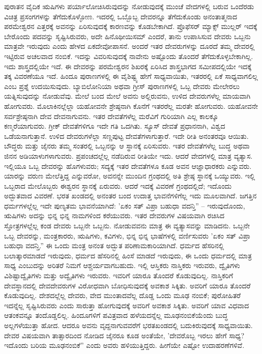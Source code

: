 ಪುರಾತನ ವೈದಿಕ ಋಷಿಗಳು ಪರ್ಯಾಲೋಚಿಸಿರುವುದನ್ನು ನೋಡುವುದಕ್ಕೆ ಮುಂಚೆ ವೇದಗಳಲ್ಲಿ ಬರುವ ಒಂದೆರಡು ವಿಚಿತ್ರ ಪ್ರಸಂಗಗಳನ್ನು ತೆಗೆದುಕೊಳ್ಳೋಣ. ಇದರಲ್ಲಿ ಒಬ್ಬೊಬ್ಬ ದೇವರನ್ನೂ ತೆಗೆದುಕೊಂಡು ಅನಂತಾತ್ಮನಾದ ಪರಮೇಶ್ವರನ ಎತ್ತರಕ್ಕೆ ಅವನನ್ನು ಏರಿಸುವುದಕ್ಕೆ ಕಾರಣವನ್ನು ಕೊಡಬೇಕಾಗಿದೆ. ಪ್ರೊಫೆಸರ್‌ ಮ್ಯಾಕ್ಸ್ ಮುಲ್ಲರ್ ಇದಕ್ಕೆ ಬೇರೊಂದು ಪದವನ್ನು ಸೃಷ್ಟಿಸಿರುವರು, ಅದೇ ಹಿನೊಥೀಯಿಸಮ್  ಎಂದರೆ, ತಾನು ಉಪಾಸಿಸುವ ದೇವರು ಒಬ್ಬನು ಮಾತ್ರವೇ ಇರುವುದು ಎಂದು ಹೇಳದ ಏಕದೇವೋಪಾಸನೆ. ಅಂದರೆ ಇತರ ದೇವರುಗಳನ್ನು ದೂರದೆ ತಮ್ಮ ದೇವರಲ್ಲಿ ಇಟ್ಟಿರುವ ಅಚಲವಾದ ನಂಬಿಕೆ. ಇದನ್ನು ವಿವರಿಸುವುದಕ್ಕೆ ನಾವೇನು ಅಷ್ಟೊಂದು ತೊಂದರೆ ತೆಗೆದುಕೊಳ್ಳಬೇಕಾಗಿಲ್ಲ. ಇದು ಶಾಸ್ತ್ರದಲ್ಲಿಯೇ ಇದೆ. ಈ ದೇವರನ್ನು ಪರಮೇಶ್ವರನ ಶಿಖರಕ್ಕೆ ಏರಿಸಿದ ಶಾಸ್ತ್ರಭಾಗದ ಸಮೀಪದಲ್ಲಿಯೇ ಇದಕ್ಕೆ ತಕ್ಕ ವಿವರಣೆಯೂ ಇದೆ. ಹಿಂದೂ ಪುರಾಣಗಳಲ್ಲಿ ಈ ವೈಶಿಷ್ಟ್ಯ ಹೇಗೆ ಸಾಧ್ಯವಾಯಿತು, ಇತರರಲ್ಲಿ ಏಕೆ ಸಾಧ್ಯವಾಗಲಿಲ್ಲ ಎಂಬ ಪ್ರಶ್ನೆ ಉದಯಿಸುವುದು. ಬ್ಯಾಬಿಲೋನಿಯಾ ಅಥವಾ ಗ್ರೀಸ್ ಪುರಾಣಗಳಲ್ಲಿ ಒಬ್ಬ ದೇವರು ಮೇಲೇರಲು ಯತ್ನಿಸುವುದನ್ನು ನೋಡುವೆವು. ಮೇಲೆ ಬಂದ ಮೇಲೆ ಅವನು ಅಲ್ಲಿರುವನು, ಉಳಿದ ದೇವರುಗಳೆಲ್ಲ ಮಾಯವಾಗಿ ಹೋಗುವರು. ಮೊಲಾಕಿನಲ್ಲೆಲ್ಲಾ ಯಹೋವನೇ ಶ್ರೇಷ್ಠನಾಗಿ ಕೊನೆಗೆ ಇತರರೆಲ್ಲ ಮರತೇ ಹೋಗುವರು. ಯಹೋವನೇ ಸರ್ವಶ್ರೇಷ್ಠನಾಗಿ ದೇವ ದೇವನಾಗುವನು. ಇತರ ದೇವತೆಗಳೆಲ್ಲ ಮರೆವಿಗೆ ಗುರಿಯಾಗಿ ಎಲ್ಲ ಕಾಲಕ್ಕೂ ಕಣ್ಮರೆಯಾಗುವರು. ಗ್ರೀಕ್ ದೇವತೆಗಳಿಗೂ ಇದೇ ಗತಿ ಒದಗಿತು. ಸ್ಯೂಸ್ ದೇವತೆ ಪ್ರಧಾನನಾಗಿ, ವಿಶ್ವದ ಒಡೆಯನಾಗುತ್ತಾನೆ. ಉಳಿದ ದೇವರುಗಳೆಲ್ಲಾ ಸಣ್ಣಪುಟ್ಟ ದೇವತೆಗಳಾಗುತ್ತಾರೆ. ಇದೇ ರೀತಿ ಅನಂತರವೂ ಆಯಿತು. ಬೌದ್ಧರು ಮತ್ತು ಜೈನರು ತಮ್ಮ ಸಂತರಲ್ಲಿ ಒಬ್ಬನನ್ನು ಆ ಸ್ಥಾನಕ್ಕೆ ಏರಿಸುವರು. ಇತರ ದೇವತೆಗಳೆಲ್ಲ ಬುದ್ಧ ಅಥವಾ ಜಿನನ ಅಡಿಯಾಳುಗಳಾಗುವರು. ಪ್ರಪಂಚದಲ್ಲೆಲ್ಲ ನಡೆದಿರುವ ರೀತಿಯೇ ಇದು. ಆದರೆ ವೇದಗಳಲ್ಲಿ ಮಾತ್ರ ವ್ಯತ್ಯಾಸ. ಇಲ್ಲಿಯೂ ಒಬ್ಬ ದೇವರನ್ನು ಹೊಗಳುವರು; ಸದ್ಯಕ್ಕೆ ಇತರ ದೇವತೆಗಳೂ ಕೂಡ ಅವನ ಆಜ್ಞಾಧಾರಕರು ಎನ್ನುವರು. ಯಾರನ್ನು ವರುಣ ಮೇಲೆತ್ತಿದ್ದ ಎನ್ನುವರೋ, ಅವನನ್ನೇ ಮುಂದಿನ ಗ್ರಂಥದಲ್ಲಿ ಅತಿ ಶ್ರೇಷ್ಠ ಸ್ಥಾನಕ್ಕೆ ಒಯ್ಯುವರು. ಇಲ್ಲಿ ಒಬ್ಬರಾದ ಮೇಲೊಬ್ಬರು ಈಶ್ವರನ ಸ್ಥಾನಕ್ಕೆ ಏರುವರು. ಆದರೆ ಇದಕ್ಕೆ ವಿವರಣೆ ಗ್ರಂಥದಲ್ಲಿದೆ; ಇದೊಂದು ಅದ್ಭುತವಾದ ವಿವರಣೆ. ಭರತ ಖಂಡದಲ್ಲಿ ಅನಂತರ ಬಂದ ಉದಾತ್ತ ಭಾವನೆಗಳಿಗೆಲ್ಲ ಇದು ಮೂಲವಾಗಿದೆ. ಜಗತ್ತಿನ ಧರ್ಮಗಳಲ್ಲೆಲ್ಲ ಇದೇ ಪುಣ್ಯತಮ ಭಾವನೆಯಾಗಿದೆ: 'ಏಕಂ ಸತ್ ವಿಪ್ರಾ ಬಹುಧಾ ವದನ್ತಿ” – ಇರುವುದೊಂದು, ಋಷಿಗಳು ಅದನ್ನು ಭಿನ್ನ ಭಿನ್ನ ನಾಮಗಳಿಂದ ಕರೆಯುವರು. ಇತರ ದೇವರುಗಳ ವಿಷಯವಾಗಿ ರಚಿಸಿದ ಸ್ತೋತ್ರಗಳಲ್ಲೆಲ್ಲ ಕಂಡ ದೇವರು ಒಬ್ಬನೇ ಒಬ್ಬನು. ನೋಡುವವನು ಮಾತ್ರ ಈ ವ್ಯತ್ಯಾಸವನ್ನು ಮಾಡಿದನು. ಒಬ್ಬನೇ ಒಬ್ಬ ದೇವರನ್ನು, ಮಂತ್ರಕಾರರು, ಋಷಿಗಳು, ಕವಿಗಳು, ಭಿನ್ನ ಭಿನ್ನ ಭಾಷೆಗಳಲ್ಲಿ ವರ್ಣಿಸುವರು 'ಏಕಂ ಸತ್ ವಿಪ್ರಾ ಬಹುಧಾ ವದನ್ತಿ.'' ಈ ಒಂದು ಮಂತ್ರ ಅನಂತ ಅದ್ಭುತ ಪರಿಣಾಮಕಾರಿಯಾಗಿದೆ. ಧರ್ಮದ ಹೆಸರಿನಲ್ಲಿ ಬಲಾತ್ಕಾರಮಾಡದೆ ಇರುವುದು, ಧರ್ಮದ ಹೆಸರಿನಲ್ಲಿ ಹಿಂಸೆ ಮಾಡದೆ ಇರುವುದು, ಈ ಒಂದು ಧರ್ಮದಲ್ಲಿ ಮಾತ್ರ ಸಾಧ್ಯ ಎಂಬುದನ್ನು ಅರಿತರೆ ನಿಮಗೆ ಆಶ್ಚರ್ಯವಾಗಬಹುದು. ಇಲ್ಲಿ ಆಸ್ತಿಕರು ನಾಸ್ತಿಕರು ಇರುವರು, ದ್ವೈತಿಗಳು ವಿಶಿಷ್ಟಾದ್ವೈತಿಗಳು ಮತ್ತು ಅದ್ವೈತಿಗಳು ಇರುವರು. ಇವರಿಗೆ ಯಾರೂ ತೊಂದರೆ ಕೊಡುವುದಿಲ್ಲ. ನಾಸ್ತಿಕರಿಗೆ ದೇವಸ್ಥಾನದಲ್ಲಿ ದೇವದೇವರುಗಳ ವಿರೋಧವಾಗಿ ಬೋಧಿಸುವುದಕ್ಕೆ ಅವಕಾಶ ಸಿಕ್ಕಿತು. ಅವರಿಗೆ ಯಾರೂ ತೊಂದರೆ ಕೊಡುವುದಿಲ್ಲ. ದೇಶದಲ್ಲೆಲ್ಲ ದೇವರು, ವೇದ ಮುಂತಾದವೆಲ್ಲ ದೊಡ್ಡ ಒಂದು ಮೂಢ ನಂಬಿಕೆ; ಪುರೋಹಿತರೆ ಇದನ್ನೆಲ್ಲ ಸೃಷ್ಟಿಸಿರುವರು ಎಂದು ಸಾರುತ್ತಾ ಹೋಗುವುದಕ್ಕೆ ಅವರಿಗೆ ಅವಕಾಶ ಸಿಕ್ಕಿತು. ಅವರಿಗೆ ಯಾವ ವಿಧವಾದ ಆತಂಕವನ್ನೂ ತಂದೊಡ್ಡಲಿಲ್ಲ. ಹಿಂದೂಗಳಿಗೆ ಪವಿತ್ರವಾದ ಹಳೆಯದನ್ನೆಲ್ಲ ಮೂಢನಂಬಿಕೆಯೆಂದು ಬುದ್ಧ ಅಲ್ಲಗಳೆಯುತ್ತಾ ಹೋದ. ಆದರೂ ಅವನು ವೃದ್ದನಾಗುವವರೆಗೆ ಭರತಖಂಡದಲ್ಲಿ ಬದುಕಿರುವುದಕ್ಕೆ ಸಾಧ್ಯವಾಯಿತು. ದೇವರ ವಿಷಯವಾಗಿ ತಾತ್ಸಾರದಿಂದ ನೋಡಿದ ಜೈನರೂ ಕೂಡ ಅಂತೆಯೇ, 'ದೇವರೊಬ್ಬ ಇರಲು ಹೇಗೆ ಸಾಧ್ಯ? ಇದೊಂದು ಬರಿಯ ಮೂಢನಂಬಿಕೆ'' ಎಂದು ಅವರು ಹಳಿಯುತ್ತಿದ್ದರು. ಹೀಗೆಯೇ ಎಷ್ಟೋ ಉದಾಹರಣೆಗಳಿವೆ.

